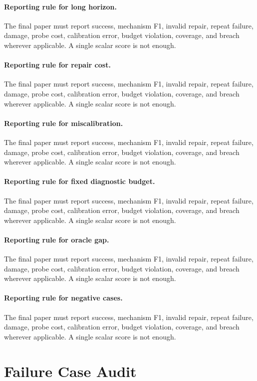 \documentclass{article}
\begin{document}
\paragraph{Reporting rule for long horizon.} The final paper must report success, mechanism F1, invalid repair, repeat failure, damage, probe cost, calibration error, budget violation, coverage, and breach wherever applicable. A single scalar score is not enough.
\paragraph{Reporting rule for repair cost.} The final paper must report success, mechanism F1, invalid repair, repeat failure, damage, probe cost, calibration error, budget violation, coverage, and breach wherever applicable. A single scalar score is not enough.
\paragraph{Reporting rule for miscalibration.} The final paper must report success, mechanism F1, invalid repair, repeat failure, damage, probe cost, calibration error, budget violation, coverage, and breach wherever applicable. A single scalar score is not enough.
\paragraph{Reporting rule for fixed diagnostic budget.} The final paper must report success, mechanism F1, invalid repair, repeat failure, damage, probe cost, calibration error, budget violation, coverage, and breach wherever applicable. A single scalar score is not enough.
\paragraph{Reporting rule for oracle gap.} The final paper must report success, mechanism F1, invalid repair, repeat failure, damage, probe cost, calibration error, budget violation, coverage, and breach wherever applicable. A single scalar score is not enough.
\paragraph{Reporting rule for negative cases.} The final paper must report success, mechanism F1, invalid repair, repeat failure, damage, probe cost, calibration error, budget violation, coverage, and breach wherever applicable. A single scalar score is not enough.
\clearpage
\section{Failure Case Audit}
\end{document}

